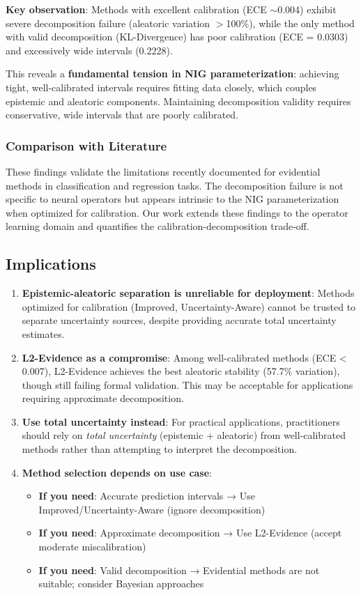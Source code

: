 \textbf{Key observation}: Methods with excellent calibration (ECE $\sim$0.004) exhibit severe decomposition failure (aleatoric variation $>$100\%), while the only method with valid decomposition (KL-Divergence) has poor calibration (ECE = 0.0303) and excessively wide intervals (0.2228).

This reveals a \textbf{fundamental tension in NIG parameterization}: achieving tight, well-calibrated intervals requires fitting data closely, which couples epistemic and aleatoric components. Maintaining decomposition validity requires conservative, wide intervals that are poorly calibrated.

\subsubsection{Comparison with Literature}

These findings validate the limitations recently documented for evidential methods in classification and regression tasks. The decomposition failure is not specific to neural operators but appears intrinsic to the NIG parameterization when optimized for calibration. Our work extends these findings to the operator learning domain and quantifies the calibration-decomposition trade-off.

\subsection{Implications}

\begin{enumerate}
\item \textbf{Epistemic-aleatoric separation is unreliable for deployment}: Methods optimized for calibration (Improved, Uncertainty-Aware) cannot be trusted to separate uncertainty sources, despite providing accurate total uncertainty estimates.

\item \textbf{L2-Evidence as a compromise}: Among well-calibrated methods (ECE < 0.007), L2-Evidence achieves the best aleatoric stability (57.7\% variation), though still failing formal validation. This may be acceptable for applications requiring approximate decomposition.

\item \textbf{Use total uncertainty instead}: For practical applications, practitioners should rely on \textit{total uncertainty} (epistemic + aleatoric) from well-calibrated methods rather than attempting to interpret the decomposition.

\item \textbf{Method selection depends on use case}:
\begin{itemize}
\item \textbf{If you need}: Accurate prediction intervals → Use Improved/Uncertainty-Aware (ignore decomposition)
\item \textbf{If you need}: Approximate decomposition → Use L2-Evidence (accept moderate miscalibration)
\item \textbf{If you need}: Valid decomposition → Evidential methods are not suitable; consider Bayesian approaches
\end{itemize}
\end{enumerate}

